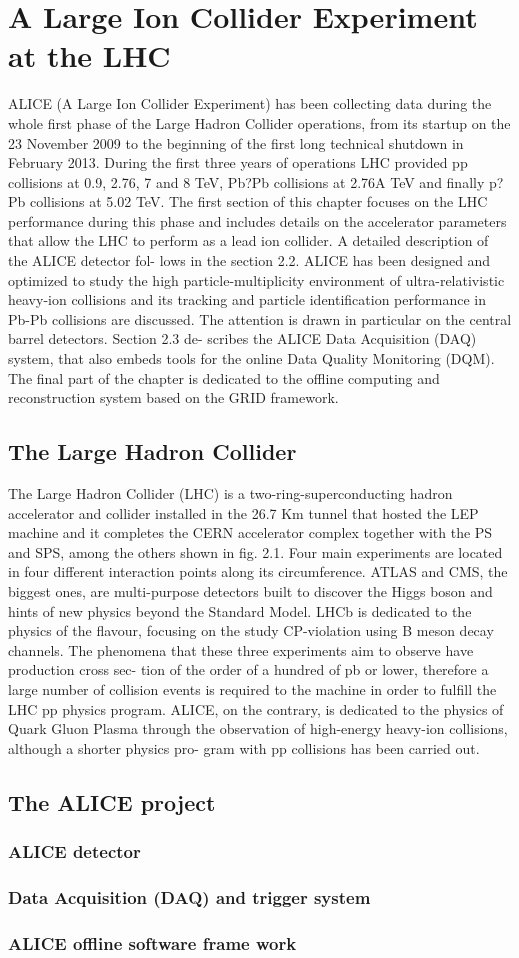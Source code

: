 \section{A Large Ion Collider Experiment at the LHC}
ALICE (A Large Ion Collider Experiment) has been collecting data during the whole first phase of the Large Hadron Collider operations, from its startup on the 23 November 2009 to the beginning of the first long technical shutdown in February 2013. During the first three years of operations LHC provided pp collisions at 0.9, 2.76, 7 and 8 TeV, Pb?Pb collisions at 2.76A TeV and finally p?Pb collisions at 5.02 TeV. The first section of this chapter focuses on the LHC performance during this phase and includes details on the accelerator parameters that allow the LHC to perform as a lead ion collider. A detailed description of the ALICE detector fol- lows in the section 2.2. ALICE has been designed and optimized to study the high particle-multiplicity environment of ultra-relativistic heavy-ion collisions and its tracking and particle identification performance in Pb-Pb collisions are discussed. The attention is drawn in particular on the central barrel detectors. Section 2.3 de- scribes the ALICE Data Acquisition (DAQ) system, that also embeds tools for the online Data Quality Monitoring (DQM). The final part of the chapter is dedicated to the offline computing and reconstruction system based on the GRID framework.


\subsection{The Large Hadron Collider}
The Large Hadron Collider (LHC) \cite{cite:LHC} is a two-ring-superconducting hadron accelerator and collider installed in the 26.7 Km tunnel that hosted the LEP machine and it completes the CERN accelerator complex together with the PS and SPS, among the others shown in fig. 2.1. Four main experiments are located in four different interaction points along its circumference. ATLAS and CMS, the biggest ones, are multi-purpose detectors built to discover the Higgs boson and hints of new physics beyond the Standard Model. LHCb is dedicated to the physics of the flavour, focusing on the study CP-violation using B meson decay channels. The phenomena that these three experiments aim to observe have production cross sec- tion of the order of a hundred of pb or lower, therefore a large number of collision events is required to the machine in order to fulfill the LHC pp physics program. ALICE, on the contrary, is dedicated to the physics of Quark Gluon Plasma through the observation of high-energy heavy-ion collisions, although a shorter physics pro- gram with pp collisions has been carried out.

\subsection{The ALICE project}
\subsubsection{ALICE detector}
\subsubsection{Data Acquisition (DAQ) and trigger system}
\subsubsection{ALICE offline software frame work}
